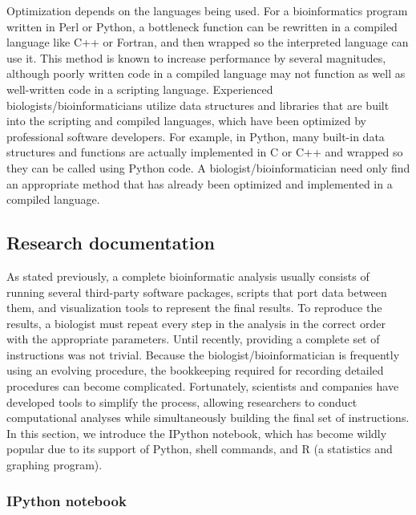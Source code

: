 \documentclass[ChapterTOCs,krantz2]{krantz} %
\begin{document}
Optimization depends on the
languages being used. For a bioinformatics program written in Perl or Python, a
bottleneck function can be rewritten in a compiled language like C++ or
Fortran, and then wrapped so the interpreted language can use it.  This method is
known to increase performance by several magnitudes,
although poorly written code in a compiled language may not function as well as
well-written code in a scripting language.  Experienced
biologists/bioinformaticians utilize data structures and libraries that are
built into the scripting and compiled languages, which have been optimized by
professional software developers.  For example, in Python, many built-in data
structures and functions are actually implemented in C or C++ and wrapped so
they can be called using Python code.  A biologist/bioinformatician need only 
find an appropriate method that has already
been optimized and implemented in a compiled language.  

\subsection{Research documentation}

As stated previously, a complete bioinformatic analysis usually
consists of running several third-party software packages, scripts that port
data between them, and visualization tools to represent the final
results.  To reproduce the results, a biologist must
repeat every step in the analysis in the correct order with the appropriate
parameters. Until recently, providing a
complete set of instructions was not trivial.
Because the biologist/bioinformatician is frequently using an evolving
procedure, the bookkeeping required for recording detailed procedures
can become complicated.
Fortunately, scientists and companies have developed tools to simplify
the process, allowing researchers to conduct computational analyses while
simultaneously building the final set of instructions. 
In this section, we introduce the IPython notebook, which has become
wildly popular due to its support of Python, shell commands, and R (a
statistics and graphing program). 
 
\subsubsection{IPython notebook}
\end{document}
